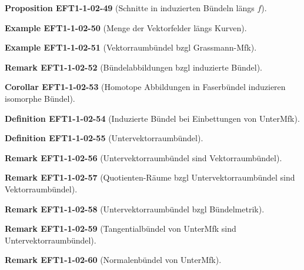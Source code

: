 \documentclass[10pt, letterpaper]{article}
\newcommand{\CustomHeading}[3]{%
  \par\medskip\noindent%
  \textbf{#1 #2} \textnormal{(#3)}.\enskip%
}
\newenvironment{DEF}[2]{\CustomHeading{Definition}{#1}{#2}}{}
\newenvironment{PROP}[2]{\CustomHeading{Proposition}{#1}{#2}}{}
\newenvironment{KORO}[2]{\CustomHeading{Corollar}{#1}{#2}}{}
\newenvironment{REM}[2]{\CustomHeading{Remark}{#1}{#2}}{}
\newenvironment{EXA}[2]{\CustomHeading{Example}{#1}{#2}}{}
\begin{document}
\begin{PROP}{EFT1-1-02-49}{Schnitte in induzierten Bündeln längs $f$}
\end{PROP}

\begin{EXA}{EFT1-1-02-50}{Menge der Vektorfelder längs Kurven}
\end{EXA}

\begin{EXA}{EFT1-1-02-51}{Vektorraumbündel bzgl Grassmann-Mfk}
\end{EXA}

\begin{REM}{EFT1-1-02-52}{Bündelabbildungen bzgl induzierte Bündel}
\end{REM}

\begin{KORO}{EFT1-1-02-53}{Homotope Abbildungen in Faserbündel induzieren isomorphe Bündel}
\end{KORO}

\begin{DEF}{EFT1-1-02-54}{Induzierte Bündel bei Einbettungen von UnterMfk}
\end{DEF}

\begin{DEF}{EFT1-1-02-55}{Untervektorraumbündel}
\end{DEF}

\begin{REM}{EFT1-1-02-56}{Untervektorraumbündel sind Vektorraumbündel}
\end{REM}

\begin{REM}{EFT1-1-02-57}{Quotienten-Räume bzgl Untervektorraumbündel sind Vektorraumbündel}
\end{REM}

\begin{REM}{EFT1-1-02-58}{Untervektorraumbündel bzgl Bündelmetrik}
\end{REM}

\begin{REM}{EFT1-1-02-59}{Tangentialbündel von UnterMfk sind Untervektorraumbündel}
\end{REM}

\begin{REM}{EFT1-1-02-60}{Normalenbündel von UnterMfk}
\end{REM}
\end{document}
